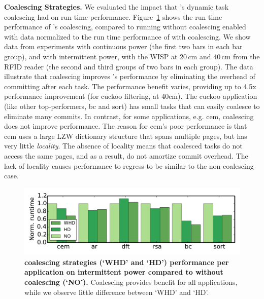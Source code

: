 \textbf{Coalescing Strategies.} We evaluated the impact that \sys's dynamic task coalescing had on run time performance.  Figure~\ref{fig:coalescing} shows the run time performance of \sys's coalescing, compared to \sys running without coalescing enabled with data normalized to the run time performance of \sys with coalescing.  We show data from experiments with continuous power (the first two bars in each bar
group), and with intermittent power, with the WISP at 20\,cm and 40\,cm from the
RFID reader (the second and third groups of two bars in each group). The data illustrate that coalescing improves \sys's performance by eliminating the overhead of committing after each task.  The performance benefit varies, providing up to 4.5x performance improvement (for cuckoo filtering, at 40cm). The cuckoo application (like other top-performers, bc and sort) has small tasks that \sys can easily coalesce to eliminate many commits. In contrast, for some applications, e.g. cem, coalescing does not improve performance. The reason for cem's poor performance is that cem uses a large LZW dictionary structure that spans multiple pages, but has very little {\em locality}. The absence of locality means that coalesced tasks do not access the same pages, and as a result, do not amortize commit overhead. The lack of locality causes performance to regress to be similar to the non-coalescing case. 


\begin{figure}
	\centering
	\includegraphics[width=\columnwidth]{figures/coalStrategies}
	\caption{\textbf{\sys coalescing strategies (`WHD' and `HD') performance per application on intermittent power compared to \sys without coalescing (`NO').} Coalescing provides benefit for all applications, while we observe little difference between `WHD' and `HD'.}
	\label{fig:coalescing}
\end{figure}



